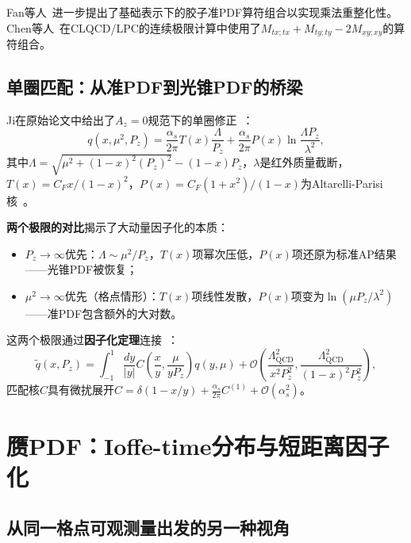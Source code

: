 \documentclass[12pt,a4paper]{ctexart}
\theoremstyle{definition}
\begin{document}
Fan等人~\cite{Fan2018gluonQuasi}进一步提出了基础表示下的胶子准PDF算符组合以实现乘法重整化性。Chen等人~\cite{Chen2025gluon}在CLQCD/LPC的连续极限计算中使用了$M_{tx;tx} + M_{ty;ty} - 2M_{xy;xy}$的算符组合。

\subsection{单圈匹配：从准PDF到光锥PDF的桥梁}

Ji在原始论文中给出了$A_z = 0$规范下的单圈修正~\cite{Ji2013Euclidean}：
\begin{equation}
q(x, \mu^2, P_z) = \frac{\alpha_s}{2\pi} T(x) \frac{\Lambda}{P_z} + \frac{\alpha_s}{2\pi} P(x) \ln\frac{\Lambda P_z}{\lambda^2},
\label{eq:oneloop_quasi}
\end{equation}
其中$\Lambda = \sqrt{\mu^2 + (1-x)^2(P_z)^2} - (1-x)P_z$，$\lambda$是红外质量截断，$T(x) = C_F x/(1-x)^2$，$P(x) = C_F(1+x^2)/(1-x)$为Altarelli-Parisi核~\cite{AltarelliParisi1977}。

\textbf{两个极限的对比}揭示了大动量因子化的本质：
\begin{itemize}
    \item $P_z \to \infty$优先：$\Lambda \sim \mu^2/P_z$，$T(x)$项幂次压低，$P(x)$项还原为标准AP结果——光锥PDF被恢复；
    \item $\mu^2 \to \infty$优先（格点情形）：$T(x)$项线性发散，$P(x)$项变为$\ln(\mu P_z/\lambda^2)$——准PDF包含额外的大对数。
\end{itemize}

这两个极限通过\textbf{因子化定理}连接~\cite{Ji2013Euclidean,Izubuchi2018}：
\begin{equation}
\tilde q(x, P_z) = \int_{-1}^1 \frac{dy}{|y|} C\!\left(\frac{x}{y}, \frac{\mu}{y P_z}\right) q(y, \mu) + \mathcal{O}\!\left(\frac{\Lambda_{\text{QCD}}^2}{x^2 P_z^2}, \frac{\Lambda_{\text{QCD}}^2}{(1-x)^2 P_z^2}\right),
\label{eq:LaMET_factorization}
\end{equation}
匹配核$C$具有微扰展开$C = \delta(1-x/y) + \frac{\alpha_s}{2\pi}C^{(1)} + \mathcal{O}(\alpha_s^2)$。

\section{赝PDF：Ioffe-time分布与短距离因子化}

\subsection{从同一格点可观测量出发的另一种视角}
\end{document}
